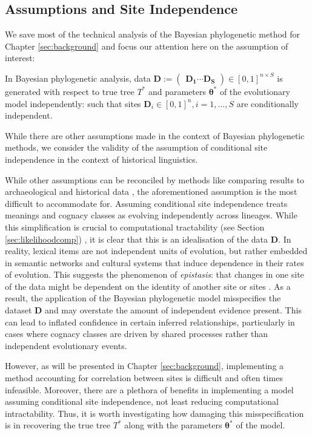 \subsection{Assumptions and Site Independence}
We save most of the technical analysis of the Bayesian phylogenetic method for Chapter 
\ref{sec:background} and focus our attention here on the assumption of interest:  
\begin{definition} 
In Bayesian phylogenetic analysis, data $\mathbf{D} := \begin{pmatrix} \mathbf{D_1} \cdots \mathbf{D_S} \end{pmatrix} \in [0, 1]^{n \times S}$ is generated with respect to true tree $T^*$ and parameters $\boldsymbol{\theta}^*$ of the evolutionary model independently: such that sites $\mathbf{D}_i \in [0, 1]^n, i=1, ..., S$ are conditionally independent.
\end{definition}
While there are other assumptions made in the context of Bayesian phylogenetic methods, we consider the validity of the assumption of conditional site independence in the context of historical linguistics. 

While other assumptions can be reconciled by methods like comparing results to archaeological and historical data \cite{Gerardi2023}, the aforementioned assumption is the most difficult to accommodate for. Assuming conditional site independence treats meanings and cognacy classes as evolving independently across lineages. While this simplification is crucial to computational tractability (see Section \ref{sec:likelihoodcomp}) \cite{hoffmann_bayesian_2021}, it is clear that this is an idealisation of the data $\mathbf{D}$. In reality, lexical items are not independent units of evolution, but rather embedded in semantic networks and cultural systems that induce dependence in their rates of evolution. This suggests the phenomenon of \textit{epistasis}: that changes in one site of the data might be dependent on the identity of another site or sites \cite{Magee2021}. As a result, the application of the Bayesian phylogenetic model misspecifies the dataset $\mathbf{D}$ and may overstate the amount of independent evidence present. This can lead to inflated confidence in certain inferred relationships, particularly in cases where cognacy classes are driven by shared processes rather than independent evolutionary events. 

However, as will be presented in Chapter \ref{sec:background}, implementing a method accounting for correlation between sites is difficult and often times infeasible. Moreover, there are a plethora of benefits in implementing a model assuming conditional site independence, not least reducing computational intractability. Thus, it is worth investigating how damaging this misspecification is in recovering the true tree $T^*$ along with the parameters $\boldsymbol{\theta}^*$ of the model.

